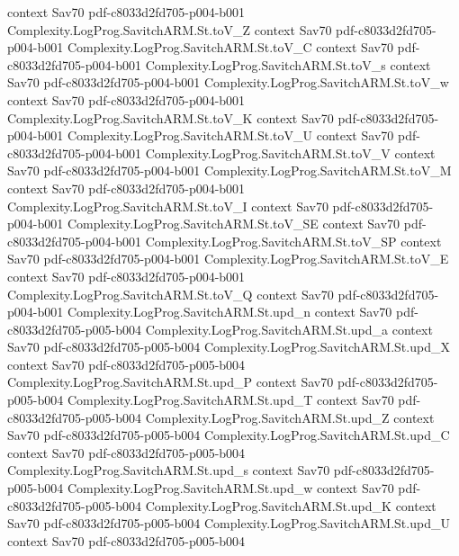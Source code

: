 \begin{theorem}
  {context}
  {Sav70}
  {pdf-c8033d2fd705-p004-b001}
\proofstep
  {Complexity.LogProg.SavitchARM.St.toV_Z}
  {context}
  {Sav70}
  {pdf-c8033d2fd705-p004-b001}
\proofstep
  {Complexity.LogProg.SavitchARM.St.toV_C}
  {context}
  {Sav70}
  {pdf-c8033d2fd705-p004-b001}
\proofstep
  {Complexity.LogProg.SavitchARM.St.toV_s}
  {context}
  {Sav70}
  {pdf-c8033d2fd705-p004-b001}
\proofstep
  {Complexity.LogProg.SavitchARM.St.toV_w}
  {context}
  {Sav70}
  {pdf-c8033d2fd705-p004-b001}
\proofstep
  {Complexity.LogProg.SavitchARM.St.toV_K}
  {context}
  {Sav70}
  {pdf-c8033d2fd705-p004-b001}
\proofstep
  {Complexity.LogProg.SavitchARM.St.toV_U}
  {context}
  {Sav70}
  {pdf-c8033d2fd705-p004-b001}
\proofstep
  {Complexity.LogProg.SavitchARM.St.toV_V}
  {context}
  {Sav70}
  {pdf-c8033d2fd705-p004-b001}
\proofstep
  {Complexity.LogProg.SavitchARM.St.toV_M}
  {context}
  {Sav70}
  {pdf-c8033d2fd705-p004-b001}
\proofstep
  {Complexity.LogProg.SavitchARM.St.toV_I}
  {context}
  {Sav70}
  {pdf-c8033d2fd705-p004-b001}
\proofstep
  {Complexity.LogProg.SavitchARM.St.toV_SE}
  {context}
  {Sav70}
  {pdf-c8033d2fd705-p004-b001}
\proofstep
  {Complexity.LogProg.SavitchARM.St.toV_SP}
  {context}
  {Sav70}
  {pdf-c8033d2fd705-p004-b001}
\proofstep
  {Complexity.LogProg.SavitchARM.St.toV_E}
  {context}
  {Sav70}
  {pdf-c8033d2fd705-p004-b001}
\proofstep
  {Complexity.LogProg.SavitchARM.St.toV_Q}
  {context}
  {Sav70}
  {pdf-c8033d2fd705-p004-b001}
\proofstep
  {Complexity.LogProg.SavitchARM.St.upd_n}
  {context}
  {Sav70}
  {pdf-c8033d2fd705-p005-b004}
\proofstep
  {Complexity.LogProg.SavitchARM.St.upd_a}
  {context}
  {Sav70}
  {pdf-c8033d2fd705-p005-b004}
\proofstep
  {Complexity.LogProg.SavitchARM.St.upd_X}
  {context}
  {Sav70}
  {pdf-c8033d2fd705-p005-b004}
\proofstep
  {Complexity.LogProg.SavitchARM.St.upd_P}
  {context}
  {Sav70}
  {pdf-c8033d2fd705-p005-b004}
\proofstep
  {Complexity.LogProg.SavitchARM.St.upd_T}
  {context}
  {Sav70}
  {pdf-c8033d2fd705-p005-b004}
\proofstep
  {Complexity.LogProg.SavitchARM.St.upd_Z}
  {context}
  {Sav70}
  {pdf-c8033d2fd705-p005-b004}
\proofstep
  {Complexity.LogProg.SavitchARM.St.upd_C}
  {context}
  {Sav70}
  {pdf-c8033d2fd705-p005-b004}
\proofstep
  {Complexity.LogProg.SavitchARM.St.upd_s}
  {context}
  {Sav70}
  {pdf-c8033d2fd705-p005-b004}
\proofstep
  {Complexity.LogProg.SavitchARM.St.upd_w}
  {context}
  {Sav70}
  {pdf-c8033d2fd705-p005-b004}
\proofstep
  {Complexity.LogProg.SavitchARM.St.upd_K}
  {context}
  {Sav70}
  {pdf-c8033d2fd705-p005-b004}
\proofstep
  {Complexity.LogProg.SavitchARM.St.upd_U}
  {context}
  {Sav70}
  {pdf-c8033d2fd705-p005-b004}

\end{theorem}

